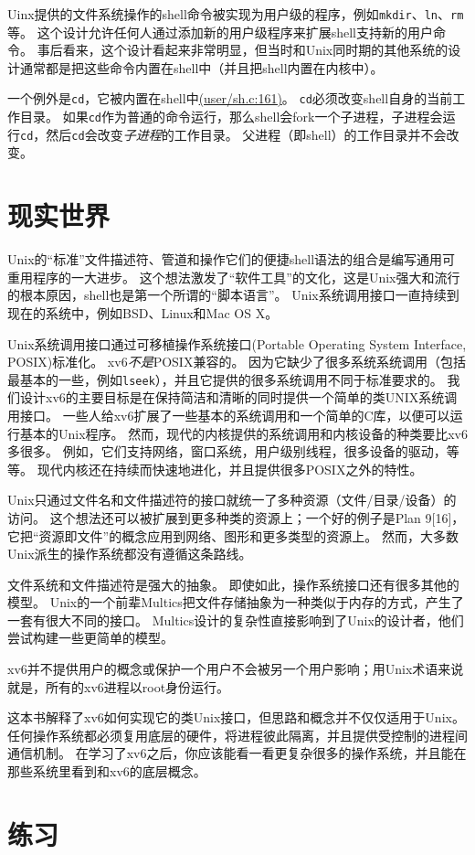 Uinx提供的文件系统操作的shell命令被实现为用户级的程序，例如\texttt{mkdir}、\texttt{ln}、\texttt{rm}等。
这个设计允许任何人通过添加新的用户级程序来扩展shell支持新的用户命令。
事后看来，这个设计看起来非常明显，但当时和Unix同时期的其他系统的设计通常都是把这些命令内置在shell中（并且把shell内置在内核中）。

一个例外是\texttt{cd}，它被内置在shell中\href{https://github.com/mit-pdos/xv6-riscv/blob/riscv//user/sh.c#L161}{(user/sh.c:161)}。
\texttt{cd}必须改变shell自身的当前工作目录。
如果\texttt{cd}作为普通的命令运行，那么shell会fork一个子进程，子进程会运行\texttt{cd}，然后\texttt{cd}会改变\emph{子进程}的工作目录。
父进程（即shell）的工作目录并不会改变。

\section{现实世界}
Unix的“标准”文件描述符、管道和操作它们的便捷shell语法的组合是编写通用可重用程序的一大进步。
这个想法激发了“软件工具”的文化，这是Unix强大和流行的根本原因，shell也是第一个所谓的“脚本语言”。
Unix系统调用接口一直持续到现在的系统中，例如BSD、Linux和Mac OS X。

Unix系统调用接口通过可移植操作系统接口(Portable Operating System Interface, POSIX)标准化。
xv6\emph{不是}POSIX兼容的。
因为它缺少了很多系统系统调用（包括最基本的一些，例如\texttt{lseek}），并且它提供的很多系统调用不同于标准要求的。
我们设计xv6的主要目标是在保持简洁和清晰的同时提供一个简单的类UNIX系统调用接口。
一些人给xv6扩展了一些基本的系统调用和一个简单的C库，以便可以运行基本的Unix程序。
然而，现代的内核提供的系统调用和内核设备的种类要比xv6多很多。
例如，它们支持网络，窗口系统，用户级别线程，很多设备的驱动，等等。
现代内核还在持续而快速地进化，并且提供很多POSIX之外的特性。

Unix只通过文件名和文件描述符的接口就统一了多种资源（文件/目录/设备）的访问。
这个想法还可以被扩展到更多种类的资源上；一个好的例子是Plan 9[16]，它把“资源即文件”的概念应用到网络、图形和更多类型的资源上。
然而，大多数Unix派生的操作系统都没有遵循这条路线。

文件系统和文件描述符是强大的抽象。
即使如此，操作系统接口还有很多其他的模型。
Unix的一个前辈Multics把文件存储抽象为一种类似于内存的方式，产生了一套有很大不同的接口。
Multics设计的复杂性直接影响到了Unix的设计者，他们尝试构建一些更简单的模型。

xv6并不提供用户的概念或保护一个用户不会被另一个用户影响；用Unix术语来说就是，所有的xv6进程以root身份运行。

这本书解释了xv6如何实现它的类Unix接口，但思路和概念并不仅仅适用于Unix。
任何操作系统都必须复用底层的硬件，将进程彼此隔离，并且提供受控制的进程间通信机制。
在学习了xv6之后，你应该能看一看更复杂很多的操作系统，并且能在那些系统里看到和xv6的底层概念。

\section{练习}

